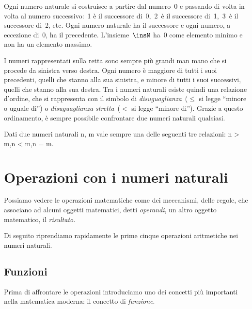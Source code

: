 \begin{inaccessibleblock}
\begin{center}
 
\end{center}
\end{inaccessibleblock}

Ogni numero naturale si costruisce a partire dal numero~0 e passando di 
volta in volta al numero successivo:~1 è il successore di~0,~2~è il 
successore di~1,~3~è il successore di~2, etc. 
Ogni numero naturale ha il successore e ogni numero, a eccezione di~0, ha il
precedente. 
L'insieme~\(\insN\) ha~0 come elemento minimo e non ha un elemento massimo.

I numeri rappresentati sulla retta sono sempre più grandi man mano che si 
procede da sinistra verso destra. 
Ogni numero è maggiore di tutti i suoi precedenti, quelli che stanno alla 
sua sinistra, e minore di tutti i suoi successivi, quelli che stanno alla 
sua destra. 
Tra i numeri naturali esiste quindi una relazione d'ordine, che si 
rappresenta con il simbolo di 
\emph{disuguaglianza}~(\(\le\) si legge ``minore o uguale di'') o 
\emph{disuguaglianza stretta}~(\(<\) si legge ``minore di'').
Grazie a questo ordinamento, è sempre possibile confrontare due numeri 
naturali qualsiasi.

\begin{legge}[di tricotomia]
Dati due numeri naturali n, m vale sempre una delle seguenti tre relazioni: 
\quad n > m,\quad n < m,\quad n = m.
\end{legge}

\section{Operazioni con i numeri naturali}
\label{sec:01_operazioni}

Possiamo vedere le operazioni matematiche come dei meccanismi, delle regole, 
che associano ad alcuni oggetti matematici, detti \emph{operandi}, 
un altro oggetto matematico, il \emph{risultato}.

Di seguito riprendiamo rapidamente le prime cinque operazioni aritmetiche 
nei numeri naturali. 

\subsection{Funzioni}

Prima di affrontare le operazioni introduciamo uno dei concetti più importanti
nella matematica moderna: il concetto di \emph{funzione}.

